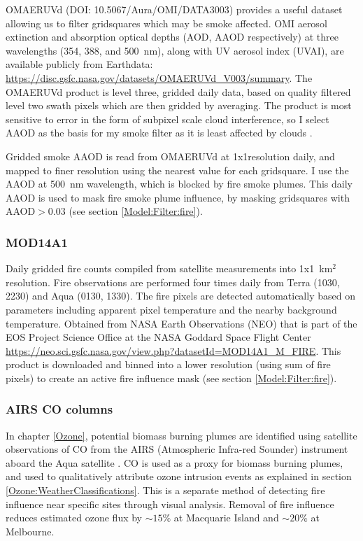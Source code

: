       
      OMAERUVd (DOI: 10.5067/Aura/OMI/DATA3003) provides a useful dataset allowing us to filter gridsquares which may be smoke affected.
      OMI aerosol extinction and absorption optical depths (AOD, AAOD respectively) at three wavelengths (354, 388, and 500~nm), along with UV aerosol index (UVAI), are available publicly from Earthdata: \url{https://disc.gsfc.nasa.gov/datasets/OMAERUVd_V003/summary}.
      The OMAERUVd product is level three, gridded daily data, based on quality filtered level two swath pixels which are then gridded by averaging.
      The product is most sensitive to error in the form of subpixel scale cloud interference, so I select AAOD as the basis for my smoke filter as it is least affected by clouds \parencite{Ahn2008}.
      
      Gridded smoke AAOD is read from OMAERUVd at 1x1\degr resolution daily, and mapped to finer resolution using the nearest value for each gridsquare.
      I use the AAOD at 500~nm wavelength, which is blocked by fire smoke plumes.
      This daily AAOD is used to mask fire smoke plume influence, by masking gridsquares with AAOD$>0.03$ (see section \ref{Model:Filter:fire}).
    
    \subsubsection{MOD14A1}
      \label{Model:Datasets:MOD14A1}
      Daily gridded fire counts compiled from satellite measurements into 1x1~km$^2$ resolution.
      Fire observations are performed four times daily from Terra (1030, 2230) and Aqua (0130, 1330).
      The fire pixels are detected automatically based on parameters including apparent pixel temperature and the nearby background temperature.
      Obtained from NASA Earth Observations (NEO) that is part of the EOS Project Science Office at the NASA Goddard Space Flight Center \url{https://neo.sci.gsfc.nasa.gov/view.php?datasetId=MOD14A1_M_FIRE}.
      This product is downloaded and binned into a lower resolution (using sum of fire pixels) to create an active fire influence mask (see section \ref{Model:Filter:fire}).
      
    \subsubsection{AIRS CO columns}
      \label{Model:Datasets:AIRS}
      
      In chapter \ref{Ozone}, potential biomass burning plumes are identified using satellite observations of CO from the AIRS (Atmospheric Infra-red Sounder) instrument aboard the Aqua satellite \parencite{AIRS3STD}.
      CO is used as a proxy for biomass burning plumes, and used to qualitatively attribute ozone intrusion events as explained in section \ref{Ozone:WeatherClassifications}.
      This is a separate method of detecting fire influence near specific sites through visual analysis.
      Removal of fire influence reduces estimated ozone flux by $\sim 15\%$ at Macquarie Island and $\sim 20\%$ at Melbourne.
  
